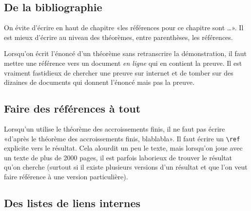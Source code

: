 \subsection{De la bibliographie}
\label{SUBooINTROpoliticsBiblio}

On évite d'écrire en haut de chapitre «les références pour ce chapitre sont \ldots». Il est mieux d'écrire au niveau des théorèmes, entre parenthèses, les références.

Lorsqu'on écrit l'énoncé d'un théorème sans retranscrire la démonstration, il faut mettre une référence vers un document \emph{en ligne} qui en contient la preuve. Il est vraiment fastidieux de chercher une preuve sur internet et de tomber sur des dizaines de documents qui donnent l'énoncé mais pas la preuve.

\subsection{Faire des références à tout}
\label{SUBooINTROpoliticsInternalRefs}

Lorsqu'un utilise le théorème des accroissements finis, il ne faut pas écrire «d'après le théorème des accroissements finis, blablabla». Il faut écrire un \verb+\ref+ explicite vers le résultat. Cela alourdit un peu le texte, mais lorsqu'on joue avec un texte de plus de 2000 pages, il est parfois laborieux de trouver le résultat qu'on cherche (surtout si il existe plusieurs versions d'un résultat et que l'on veut faire référence à une version particulière).

\subsection{Des listes de liens internes}
\label{SUBooINTROpoliticsInternalLinks}


